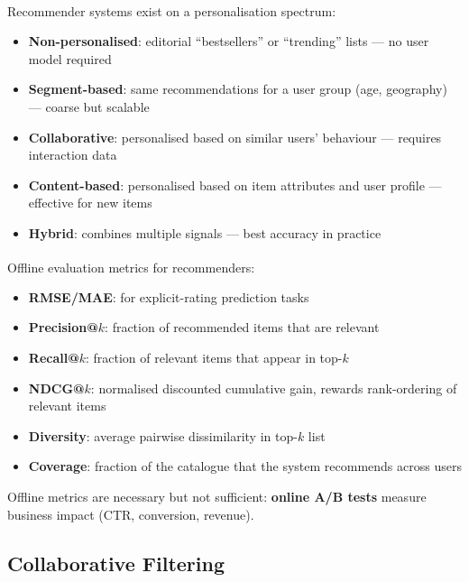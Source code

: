 \begin{tcbitemize}[ skin=sectionraster ]
    \tcbitem[title=Levels of Personalisation, raster multicolumn=3]
    Recommender systems exist on a personalisation spectrum\textsuperscript{\cite[][pp.~15--18]{jannachRecommenderSystemsIntroduction2010}}:
    \begin{itemize}
        \item \textbf{Non-personalised}: editorial ``bestsellers'' or ``trending'' lists --- no user model required
        \item \textbf{Segment-based}: same recommendations for a user group (age, geography) --- coarse but scalable
        \item \textbf{Collaborative}: personalised based on similar users' behaviour --- requires interaction data
        \item \textbf{Content-based}: personalised based on item attributes and user profile --- effective for new items
        \item \textbf{Hybrid}: combines multiple signals --- best accuracy in practice
    \end{itemize}

    \tcbitem[title=Evaluation Metrics, raster multicolumn=3]
    Offline evaluation metrics for recommenders\textsuperscript{\cite[][pp.~20--28]{aggarwalRecommenderSystems2016}}:
    \begin{itemize}
        \item \textbf{RMSE/MAE}: for explicit-rating prediction tasks
        \item \textbf{Precision@$k$}: fraction of recommended items that are relevant
        \item \textbf{Recall@$k$}: fraction of relevant items that appear in top-$k$
        \item \textbf{NDCG@$k$}: normalised discounted cumulative gain, rewards rank-ordering of relevant items
        \item \textbf{Diversity}: average pairwise dissimilarity in top-$k$ list
        \item \textbf{Coverage}: fraction of the catalogue that the system recommends across users
    \end{itemize}
    Offline metrics are necessary but not sufficient: \textbf{online A/B tests} measure business impact (CTR, conversion, revenue).

\end{tcbitemize}

\subsection{Collaborative Filtering}

